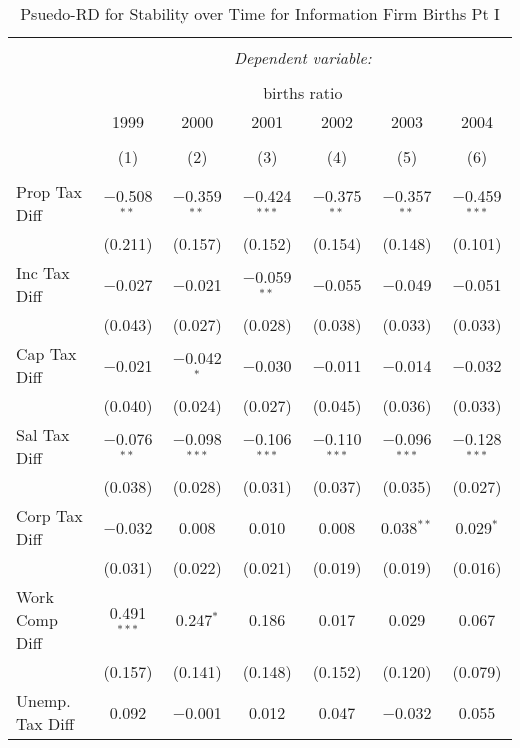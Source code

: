 
\begin{table}[!htbp] \centering 
  \caption{Psuedo-RD for Stability over Time for  Information Firm Births Pt I} 
  \label{51year} 
\small 
\begin{tabular}{@{\extracolsep{5pt}}lcccccc} 
\\[-1.8ex]\hline 
\hline \\[-1.8ex] 
 & \multicolumn{6}{c}{\textit{Dependent variable:}} \\ 
\cline{2-7} 
\\[-1.8ex] & \multicolumn{6}{c}{births ratio} \\ 
 & 1999 & 2000 & 2001 & 2002 & 2003 & 2004 \\ 
\\[-1.8ex] & (1) & (2) & (3) & (4) & (5) & (6)\\ 
\hline \\[-1.8ex] 
 Prop Tax Diff & $-$0.508$^{**}$ & $-$0.359$^{**}$ & $-$0.424$^{***}$ & $-$0.375$^{**}$ & $-$0.357$^{**}$ & $-$0.459$^{***}$ \\ 
  & (0.211) & (0.157) & (0.152) & (0.154) & (0.148) & (0.101) \\ 
  Inc Tax Diff & $-$0.027 & $-$0.021 & $-$0.059$^{**}$ & $-$0.055 & $-$0.049 & $-$0.051 \\ 
  & (0.043) & (0.027) & (0.028) & (0.038) & (0.033) & (0.033) \\ 
  Cap Tax Diff & $-$0.021 & $-$0.042$^{*}$ & $-$0.030 & $-$0.011 & $-$0.014 & $-$0.032 \\ 
  & (0.040) & (0.024) & (0.027) & (0.045) & (0.036) & (0.033) \\ 
  Sal Tax Diff & $-$0.076$^{**}$ & $-$0.098$^{***}$ & $-$0.106$^{***}$ & $-$0.110$^{***}$ & $-$0.096$^{***}$ & $-$0.128$^{***}$ \\ 
  & (0.038) & (0.028) & (0.031) & (0.037) & (0.035) & (0.027) \\ 
  Corp Tax Diff & $-$0.032 & 0.008 & 0.010 & 0.008 & 0.038$^{**}$ & 0.029$^{*}$ \\ 
  & (0.031) & (0.022) & (0.021) & (0.019) & (0.019) & (0.016) \\ 
  Work Comp Diff & 0.491$^{***}$ & 0.247$^{*}$ & 0.186 & 0.017 & 0.029 & 0.067 \\ 
  & (0.157) & (0.141) & (0.148) & (0.152) & (0.120) & (0.079) \\ 
  Unemp. Tax Diff & 0.092 & $-$0.001 & 0.012 & 0.047 & $-$0.032 & 0.055 \\ 

\end{tabular}
\end{table}

